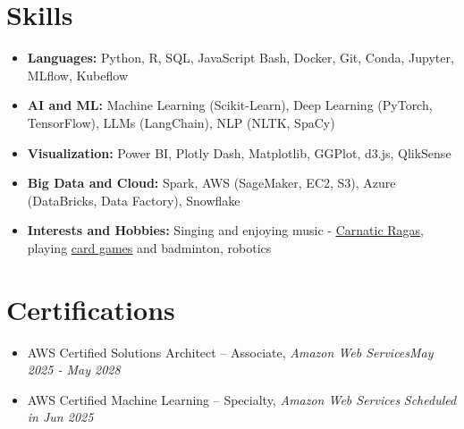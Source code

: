 \documentclass[letterpaper,11pt]{article}
\newcommand{\resumeItem}[1]{
\justifying
  \item{\small{#1}}
  \vspace{-2px}
}
\newcommand{\resumeItemListStart}{
  \vspace{-5pt}
  \begin{itemize}[leftmargin=0.21in, label=\textbullet]
}
\newcommand{\resumeItemListEnd}{\end{itemize}}
\begin{document}
\section{\Large{Skills}}
\vspace{3pt}
\begin{itemize}[leftmargin=0.00in, label={}, itemsep=0pt, parsep=0pt]
    \item{
        \small{\textbf{Languages:}}
        \small{Python, R, SQL, JavaScript} 
        \hspace{0.7cm}
        {\fontsize{10.2pt}{13pt}\selectfont{Tools:}}
        \small{Bash, Docker, Git, Conda, Jupyter, MLflow, Kubeflow}
        }




    \item{
        \small{\textbf{AI and ML:}}
        \small{Machine Learning (Scikit-Learn), Deep Learning (PyTorch, TensorFlow), LLMs (LangChain), NLP (NLTK, SpaCy)}
        }

    \item{
        \small{\textbf{Visualization:}}
        \small{Power BI, Plotly Dash, Matplotlib, GGPlot, d3.js, QlikSense}
        }
        
    \item{
        \small{\textbf{Big Data and Cloud:}}
        \small{Spark, AWS (SageMaker, EC2, S3), Azure (DataBricks, Data Factory), Snowflake}
        }

    
    \item{
    \small{\textbf{Interests and Hobbies:}}
    \small{Singing and enjoying music - \href{https://vishuragams.pages.dev}{\underline{Carnatic Ragas}}, playing \href{https://vishugp.github.io/Thuruppu/}{\underline{card games}} and badminton, robotics}
    }
\end{itemize}


\vspace{-18pt}
\section{\Large{Certifications}}
\vspace{9pt}
\resumeItemListStart

\resumeItem{AWS Certified Solutions Architect – Associate, \textsl{Amazon Web Services}\hfill\sl{May 2025 - May 2028}}

\resumeItem{\vspace{-6pt}AWS Certified Machine Learning – Specialty, \textsl{Amazon Web Services} \hfill\sl{Scheduled in Jun 2025}}

\resumeItemListEnd
\end{document}
